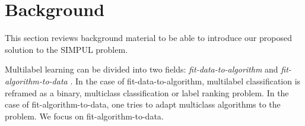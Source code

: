 
\section{Background}
\label{sec:org8c910ea}

This section reviews background material to be able to introduce our proposed solution to the SIMPUL problem.

Multilabel learning can be divided into two fields: \emph{fit-data-to-algorithm} and \emph{fit-algorithm-to-data} \cite{multilabelReview, multilabelReview2}. In the case of fit-data-to-algorithm, multilabel classification is reframed as a binary, multiclass classification or label ranking problem. In the case of fit-algorithm-to-data, one tries to adapt multiclass algorithms to the problem. We focus on fit-algorithm-to-data. 

